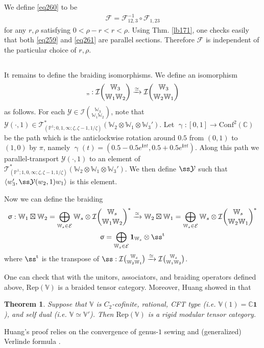 \documentclass[12pt,a4paper,notitlepage]{article}
\theoremstyle{definition}
\theoremstyle{plain}
\newtheorem{thm}[df]{Theorem}
\newcommand{\mc}{\mathcal}
\newcommand{\tr}{\mathrm{t}} %
\newcommand{\id}{\mathbf{1}}
\newcommand{\Conf}{\mathrm{Conf}}
\newcommand{\Rep}{\mathrm{Rep}}
\newcommand{\bk}[1]{\langle {#1}\rangle}
\newcommand{\scr}{\mathscr}
\newcommand{\im}{\mathbf{i}}
\newcommand{\Vbb}{\mathbb V}
\newcommand{\Wbb}{\mathbb W}
\newcommand{\Cbb}{\mathbb C}
\newcommand{\Pbb}{\mathbb P}
\numberwithin{equation}{section}
\begin{document}
We define \eqref{eq260} to be
\begin{align}
\mc F=\mc F_{12,3}^{-1}\circ\mc F_{1,23}
\end{align}
for any $r,\rho$ satisfying $0<\rho-r<r<\rho$. Using Thm. \ref{lb171}, one checks easily that both \eqref{eq259} and \eqref{eq261} are parallel sections. Therefore $\mc F$ is independent of the particular choice of $r,\rho$. 

\subsection{}\label{lb187}

It remains to define the braiding isomorphisms. We define an isomorphism
\begin{align}
\ss:\mc I{\Wbb_3\choose \Wbb_1\Wbb_2}\xrightarrow{\simeq}\mc I{\Wbb_3\choose \Wbb_2\Wbb_1}
\end{align}
as follows. For each $\mc Y\in\mc I{\Wbb_3\choose \Wbb_1\Wbb_2}$, note that $\mc Y(\cdot,1)\in\scr T_{(\Pbb^1;0,1,\infty;\zeta,\zeta-1,1/\zeta)}^*(\Wbb_2\otimes\Wbb_1\otimes\Wbb_3')$. Let  $\upgamma:[0,1]\rightarrow\Conf^2(\Cbb)$ be the path which is the anticlockwise rotation around $0.5$ from $(0,1)$ to $(1,0)$ by $\pi$, namely $\upgamma(t)=(0.5-0.5e^{\im\pi t},0.5+0.5e^{\im\pi t})$. Along this path we parallel-transport $\mc Y(\cdot,1)$ to an element of $\scr T_{(\Pbb^1;1,0,\infty;\zeta,\zeta-1,1/\zeta)}^*(\Wbb_2\otimes\Wbb_1\otimes\Wbb_3')$. We then define $\ss\mc Y$ such that $\bk{w_3',\ss\mc Y(w_2,1)w_1}$ is this element.

Now we can define the braiding 
\begin{gather}
\begin{gathered}
\upsigma:\Wbb_1\boxtimes\Wbb_2=\bigoplus_{\Wbb_s\in\mc E}\Wbb_s\otimes\mc I{\Wbb_s\choose \Wbb_1\Wbb_2}^*\xrightarrow{\simeq}\Wbb_2\boxtimes\Wbb_1=\bigoplus_{\Wbb_s\in\mc E}\Wbb_s\otimes\mc I{\Wbb_s\choose \Wbb_2\Wbb_1}^*\\
\upsigma=\bigoplus_{\Wbb_s\in\mc E}\id_{\Wbb_s}\otimes \ss^\tr
\end{gathered}
\end{gather}
where $\ss^\tr$ is the transpose of $\ss:\mc I{\Wbb_s\choose \Wbb_2\Wbb_1}\xrightarrow{\simeq}\mc I{\Wbb_s\choose \Wbb_1\Wbb_2}$.

One can check that with the unitors, associators, and braiding operators defined above, $\Rep(\Vbb)$ is a braided tensor category. Moreover, Huang showed in \cite{Hua08b} that
\begin{thm}
Suppose that $\Vbb$ is $C_2$-cofinite, rational, CFT type (i.e. $\Vbb(1)=\Cbb\id$), and self dual (i.e. $\Vbb\simeq\Vbb'$). Then $\Rep(\Vbb)$ is a rigid modular tensor category.
\end{thm}
Huang's proof relies on the convergence of genus-$1$ sewing \cite{Hua05} and (generalized) Verlinde formula \cite{Hua08a}. 
\end{document}
